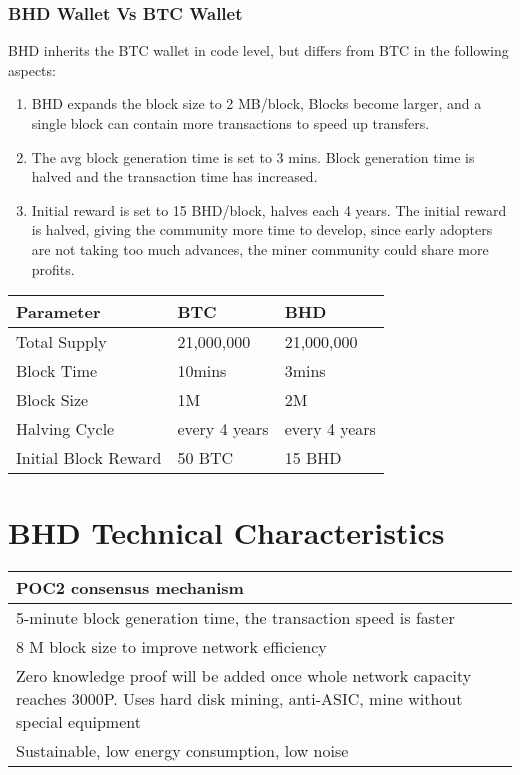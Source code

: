 \subsubsection{BHD Wallet Vs BTC Wallet}
\begin{flushleft}
    BHD inherits the BTC wallet in code level, but differs from BTC in the following aspects:
\end{flushleft}
\begin{enumerate}
    \item BHD expands the block size to 2 MB/block, Blocks become larger, and a single block can contain more transactions to speed up transfers.
    \item The avg block generation time is set to 3 mins. Block generation time is halved and the transaction time has increased.
    \item Initial reward is set to 15 BHD/block, halves each 4 years. The initial reward is halved, giving the community more time to develop, since early adopters are not taking too much advances, the miner community could share more profits.
\end{enumerate}
\begin{tabular}{ |p{5cm}|p{3cm}|p{3cm}| }
    \hline
    \rowcolor{lightgray} \textbf{Parameter} & \textbf{BTC} & \textbf{BHD} \\[5pt]
    \hline
    Total Supply & 21,000,000 & 21,000,000 \\[5pt]
    Block Time & 10mins & 3mins \\[5pt]
    Block Size & 1M & 2M \\[5pt]
    Halving Cycle & every 4 years & every 4 years \\[5pt]
    Initial Block Reward & 50 BTC & 15 BHD \\[5pt]
    \hline
\end{tabular}
\section{BHD Technical Characteristics}
\begin{tabular}{ |p{12cm}| }
    \hline
    POC2 consensus mechanism\\[5pt]
    \hline
    5-minute block generation time, the transaction speed is faster\\[5pt]
    \hline
    8 M block size to improve network efficiency\\[5pt]
    \hline
    Zero knowledge proof will be added once whole network capacity reaches 3000P. Uses hard disk mining, anti-ASIC, mine without special equipment\\[5pt]
    \hline
    Sustainable, low energy consumption, low noise\\[5pt]
    \hline
\end{tabular}
